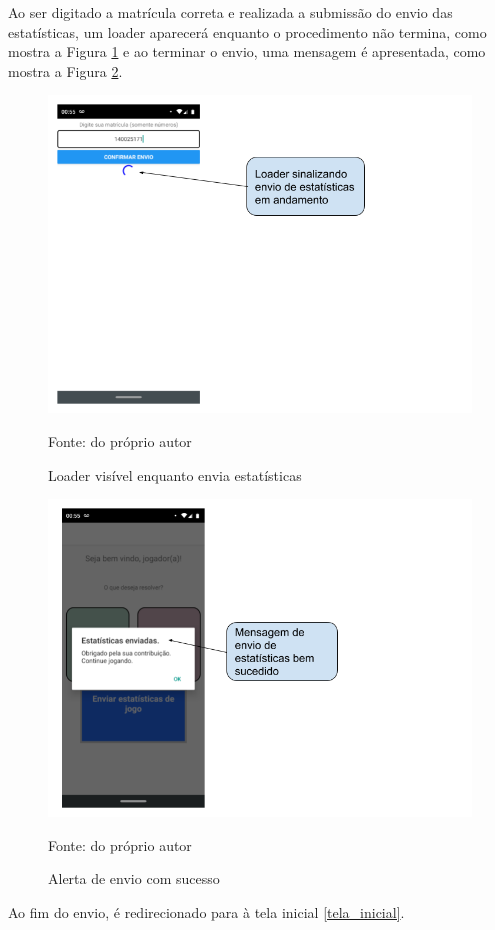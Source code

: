 Ao ser digitado a matrícula correta e realizada a submissão do envio das estatísticas, um loader aparecerá enquanto o procedimento não termina, como mostra a Figura \ref{loader} e ao terminar o envio, uma mensagem é apresentada, como mostra a Figura \ref{estatisticas_sucesso_envio}.

\begin{figure}[H]
\centering
\caption{Loader visível enquanto envia estatísticas}
\includegraphics[scale=0.5]{figuras/estatisticas/loader_estatisticas.png}

\label{loader}
\small{Fonte: do próprio autor}
\end{figure}


\begin{figure}[H]
\centering
\caption{Alerta de envio com sucesso}
\includegraphics[scale=0.5]{figuras/estatisticas/estatisticas_enviadas.png}

\label{estatisticas_sucesso_envio}
\small{Fonte: do próprio autor}
\end{figure}

Ao fim do envio, é redirecionado para à tela inicial \ref{tela_inicial}.